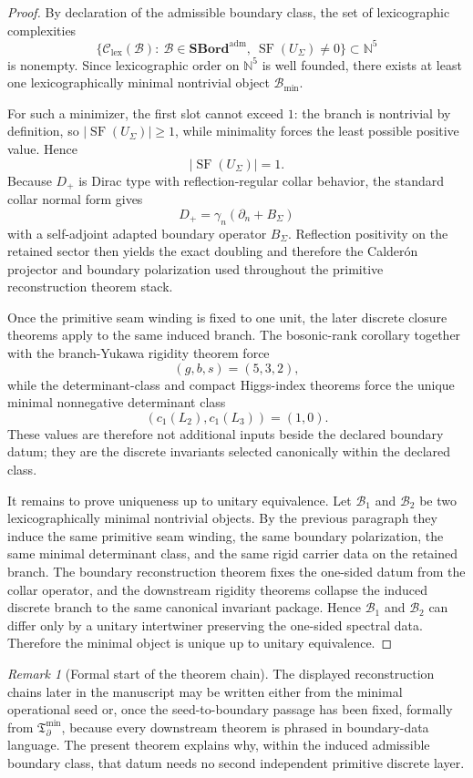 \documentclass[11pt,a4paper]{article}
\theoremstyle{definition}
\theoremstyle{remark}
\newtheorem*{remark}{Remark}
\DeclareMathOperator{\SF}{SF}
\newcommand{\Tbound}{\mathfrak T_{\partial}^{\min}}
\begin{document}
\begin{proof}
By declaration of the admissible boundary class, the set of lexicographic complexities
\[
\{\mathcal C_{\mathrm{lex}}(\mathcal B):\ \mathcal B\in \mathbf{SBord}^{\mathrm{adm}},\ \SF(U_\Sigma)\neq 0\}
\subset \mathbb N^5
\]
is nonempty. Since lexicographic order on $\mathbb N^5$ is well founded, there exists at least one
lexicographically minimal nontrivial object $\mathcal B_{\min}$.

For such a minimizer, the first slot cannot exceed $1$: the branch is nontrivial by definition, so
$|\SF(U_\Sigma)|\ge 1$, while minimality forces the least possible positive value. Hence
\[
|\SF(U_\Sigma)|=1.
\]
Because $D_+$ is Dirac type with reflection-regular collar behavior, the standard collar normal form
gives
\[
D_+=\gamma_n(\partial_n+B_\Sigma)
\]
with a self-adjoint adapted boundary operator $B_\Sigma$. Reflection positivity on the retained
sector then yields the exact doubling and therefore the Calder\'on projector and boundary
polarization used throughout the primitive reconstruction theorem stack.

Once the primitive seam winding is fixed to one unit, the later discrete closure theorems apply to
the same induced branch. The bosonic-rank corollary together with the branch-Yukawa rigidity
theorem force
\[
(g,b,s)=(5,3,2),
\]
while the determinant-class and compact Higgs-index theorems force the unique minimal nonnegative
determinant class
\[
(c_1(L_2),c_1(L_3))=(1,0).
\]
These values are therefore not additional inputs beside the declared boundary datum; they are the
discrete invariants selected canonically within the declared class.

It remains to prove uniqueness up to unitary equivalence. Let $\mathcal B_1$ and $\mathcal B_2$ be
two lexicographically minimal nontrivial objects. By the previous paragraph they induce the same
primitive seam winding, the same boundary polarization, the same minimal determinant class, and the
same rigid carrier data on the retained branch. The boundary reconstruction theorem fixes the
one-sided datum from the collar operator, and the downstream rigidity theorems collapse the induced
discrete branch to the same canonical invariant package. Hence $\mathcal B_1$ and $\mathcal B_2$
can differ only by a unitary intertwiner preserving the one-sided spectral data. Therefore the
minimal object is unique up to unitary equivalence.
\end{proof}

\begin{remark}[Formal start of the theorem chain]
The displayed reconstruction chains later in the manuscript may be written either from the minimal
operational seed or, once the seed-to-boundary passage has been fixed, formally from $\Tbound$,
because every downstream theorem is phrased in boundary-data language. The present theorem explains
why, within the induced admissible boundary class, that datum needs no second independent primitive
discrete layer.
\end{remark}
\end{document}
